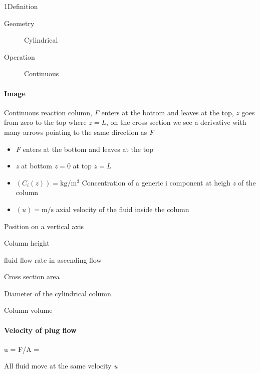 \documentclass[\mainfilename]{subfiles}
\begin{document}
\begin{sectionBox}1{Definition} %
    
    \begin{description}
        \item[Geometry] Cylindrical
        \item[Operation] Continuous
    \end{description}

    \paragraph*{Image}
    Continuous reaction column, \textit{F} enters at the bottom and leaves at the top, \(z\) goes from zero to the top where \(z=L\), on the cross section we see a derivative with many arrows pointing to the same direction as \textit{F}
    \begin{itemize}
        \item \textit{F} enters at the bottom and leaves at the top
        \item \textit{z} at bottom \(z=0\) at top \(z=L\)
        \item \((C_i(z))=\unit{\kilo\gram/\metre^3}\) Concentration of a generic i component at heigh \textit{z} of the column
        \item \((u)=\unit{\metre/\second}\) axial velocity of the fluid inside the column
    \end{itemize}

    \begin{description}[
        leftmargin=!,
        labelwidth=\widthof{\((F)=\unit{\metre^3/\hour}\)} %
    ]
        \item[\((z)=\unit{\metre}\)] 
        Position on a vertical axis 
        \item[\((L)=\unit{\metre}\)]
        Column height
        \item[\((F)=\unit{\metre^3/\hour}\)] 
        fluid flow rate in ascending flow
        \item[\((A)=\unit{\metre^2}\)] 
        Cross section area
        \item[\((d)=\unit{\metre}\)] 
        Diameter of the cylindrical column
        \item[\(V=A\,L\)] Column volume
    \end{description}

    \paragraph*{Velocity of plug flow}
    \begin{BM}
        u = F/A = 
    \end{BM}
    All fluid move at the same velocity \textit{u}


\end{sectionBox}
\end{document}
